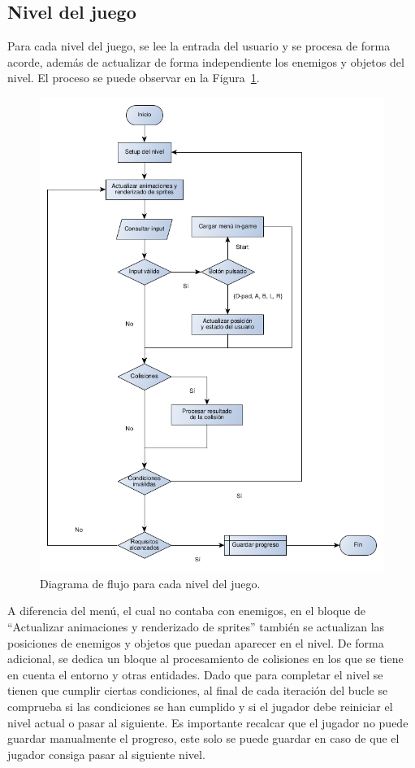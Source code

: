 \subsection{Nivel del juego}
Para cada nivel del juego, se lee la entrada del usuario y se procesa de forma acorde, además de actualizar de forma independiente los enemigos y objetos del nivel. El proceso se puede observar en la Figura~\ref{fig:flujo_nivel}.

\begin{figure}[h]
	\centering
	\includegraphics[width=.65\textwidth]{capitulos/diagramas/flujo_nivel.png}
	\caption{Diagrama de flujo para cada nivel del juego.}\label{fig:flujo_nivel}
\end{figure}
\FloatBarrier{}

A diferencia del menú, el cual no contaba con enemigos, en el bloque de ``Actualizar animaciones y renderizado de sprites'' también se actualizan las posiciones de enemigos y objetos que puedan aparecer en el nivel. De forma adicional, se dedica un bloque al procesamiento de colisiones en los que se tiene en cuenta el entorno y otras entidades. Dado que para completar el nivel se tienen que cumplir ciertas condiciones, al final de cada iteración del bucle se comprueba si las condiciones se han cumplido y si el jugador debe reiniciar el nivel actual o pasar al siguiente. Es importante recalcar que el jugador no puede guardar manualmente el progreso, este solo se puede guardar en caso de que el jugador consiga pasar al siguiente nivel.

